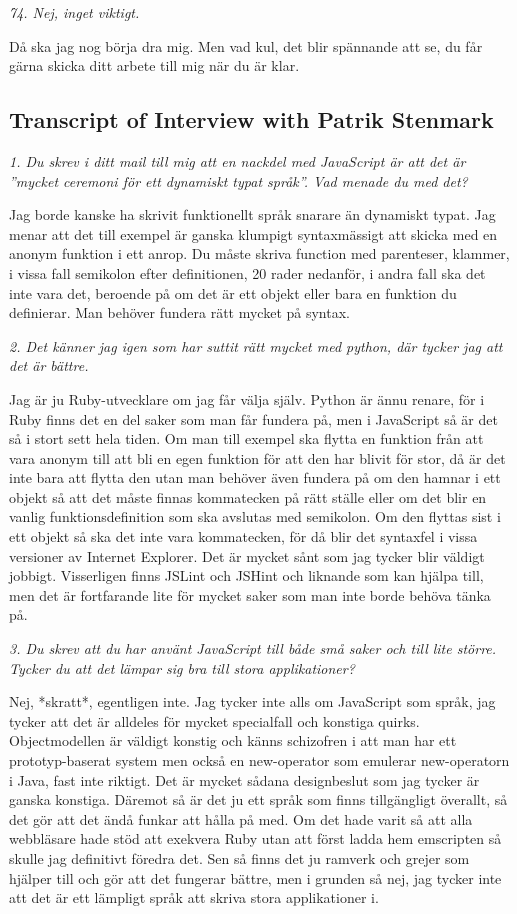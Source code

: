 \documentclass[11pt]{article}
\begin{document}
\emph{74. Nej, inget viktigt.}

Då ska jag nog börja dra mig. Men vad kul, det blir spännande att se, du får gärna skicka ditt arbete till mig när du är klar.

\subsection{Transcript of Interview with Patrik Stenmark}

\emph{1. Du skrev i ditt mail till mig att en nackdel med JavaScript är att det är ”mycket ceremoni för ett dynamiskt typat språk”. Vad menade du med det?}

Jag borde kanske ha skrivit funktionellt språk snarare än dynamiskt typat. Jag menar att det till exempel är ganska klumpigt syntaxmässigt att skicka med en anonym funktion i ett anrop. Du måste skriva function med parenteser, klammer, i vissa fall semikolon efter definitionen, 20 rader nedanför, i andra fall ska det inte vara det, beroende på om det är ett objekt eller bara en funktion du definierar. Man behöver fundera rätt mycket på syntax.

\emph{2. Det känner jag igen som har suttit rätt mycket med python, där tycker jag att det är bättre.}

Jag är ju Ruby-utvecklare om jag får välja själv. Python är ännu renare, för i Ruby finns det en del saker som man får fundera på, men i JavaScript så är det så i stort sett hela tiden. Om man till exempel ska flytta en funktion från att vara anonym till att bli en egen funktion för att den har blivit för stor, då är det inte bara att flytta den utan man behöver även fundera på om den hamnar i ett objekt så att det måste finnas kommatecken på rätt ställe eller om det blir en vanlig funktionsdefinition som ska avslutas med semikolon. Om den flyttas sist i ett objekt så ska det inte vara kommatecken, för då blir det syntaxfel i vissa versioner av Internet Explorer. Det är mycket sånt som jag tycker blir väldigt jobbigt. Visserligen finns JSLint och JSHint och liknande som kan hjälpa till, men det är fortfarande lite för mycket saker som man inte borde behöva tänka på.

\emph{3. Du skrev att du har använt JavaScript till både små saker och till lite större. Tycker du att det lämpar sig bra till stora applikationer?}

Nej, *skratt*, egentligen inte. Jag tycker inte alls om JavaScript som språk, jag tycker att det är alldeles för mycket specialfall och konstiga quirks. Objectmodellen är väldigt konstig och känns schizofren i att man har ett prototyp-baserat system men också en new-operator som emulerar new-operatorn i Java, fast inte riktigt. Det är mycket sådana designbeslut som jag tycker är ganska konstiga. Däremot så är det ju ett språk som finns tillgängligt överallt, så det gör att det ändå funkar att hålla på med. Om det hade varit så att alla webbläsare hade stöd att exekvera Ruby utan att först ladda hem emscripten så skulle jag definitivt föredra det. Sen så finns det ju ramverk och grejer som hjälper till och gör att det fungerar bättre, men i grunden så nej, jag tycker inte att det är ett lämpligt språk att skriva stora applikationer i.
\end{document}
